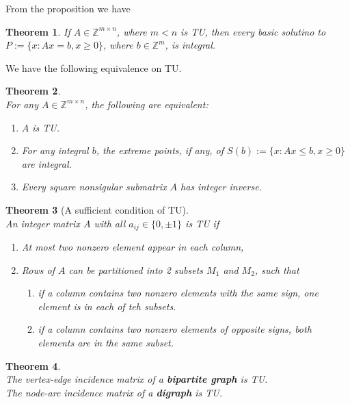 \documentclass[12pt]{article}
\newtheorem{theorem}{Theorem}[section]
\theoremstyle{definition}
\begin{document}
From the proposition we have
\begin{theorem}\normalfont If $A\in\mathbb{Z}^{m\times n}$, where $m<n$ is TU, then every basic solutino to $P:=\{x:Ax=b,x\geq 0\}$, where $b\in\mathbb{Z}^m$, is integral.
\end{theorem}
We have the following equivalence on TU.
\begin{theorem}
\hfill\\\normalfont For any $A\in \mathbb{Z}^{m\times n}$, the following are equivalent:
\begin{enumerate}
  \item $A$ is TU.
  \item For any integral $b$, the extreme points, if any, of $S(b):=\{x: Ax\leq b, x\geq 0\}$ are integral.
  \item Every square nonsigular submatrix $A$ has integer inverse.
\end{enumerate}
\end{theorem}
\begin{theorem}[A sufficient condition of TU]
\hfill\\\normalfont An integer matrix $A$ with all $a_{ij}\in\{0,\pm 1\}$ is TU if
\begin{enumerate}
  \item At most two nonzero element appear in each column,
  \item Rows of $A$ can be partitioned into 2 subsets $M_1$ and $M_2$, such that
  \begin{enumerate}
    \item if a column contains two nonzero elements with the same sign, one element is in each of teh subsets.
    \item if a column contains two nonzero elements of opposite signs, both elements are in the same subset.
  \end{enumerate}
\end{enumerate}
\end{theorem}
\begin{theorem}
\hfill\\\normalfont The vertex-edge incidence matrix of a \textbf{bipartite graph} is TU.\\
The node-arc incidence matrix of a \textbf{digraph} is TU.
\end{theorem}
\end{document}
